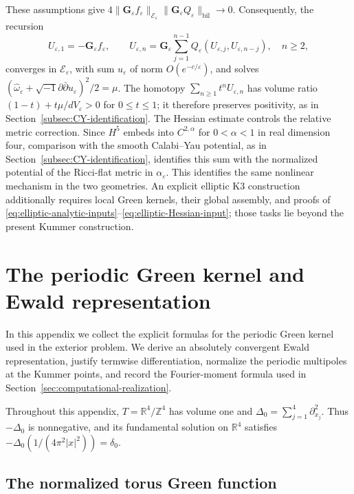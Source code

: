 \documentclass[11pt,a4paper,twoside]{article}
\numberwithin{equation}{section}
\newcommand{\ddc}{\sqrt{-1}\partial\bar\partial}
\theoremstyle{definition}
\theoremstyle{remark}
\newcommand{\ee}{\varepsilon}
\begin{document}
These assumptions give
\(4\|\mathbf G_\ee f_\ee\|_{\mathcal E_\ee}
\|\mathbf G_\ee Q_\ee\|_{\mathrm{bil}}\to0\).
Consequently, the recursion
\[
U_{\ee,1}=-\mathbf G_\ee f_\ee,\qquad
U_{\ee,n}=\mathbf G_\ee\sum_{j=1}^{n-1}
Q_\ee(U_{\ee,j},U_{\ee,n-j}),\quad n\ge2,
\]
converges in \(\mathcal E_\ee\), with sum \(u_\ee\) of norm
\(O(e^{-c/\ee})\), and solves
\((\widehat\omega_\ee+\ddc u_\ee)^2/2=\mu\).
The homotopy \(\sum_{n\ge1}t^nU_{\ee,n}\) has volume ratio
\((1-t)+t\mu/dV_\ee>0\) for \(0\le t\le1\); it therefore
preserves positivity, as in Section~\ref{subsec:CY-identification}.
The Hessian estimate controls the relative metric correction.
Since \(H^5\) embeds into \(C^{2,\alpha}\) for \(0<\alpha<1\)
in real dimension four, comparison with the smooth Calabi--Yau potential, as in
Section~\ref{subsec:CY-identification}, identifies this sum with
the normalized potential of the Ricci-flat metric in \(\alpha_\ee\).
This identifies the same nonlinear mechanism in the two geometries.
An explicit elliptic K3 construction additionally requires local
Green kernels, their global assembly, and proofs of
\eqref{eq:elliptic-analytic-inputs}--\eqref{eq:elliptic-Hessian-input};
those tasks lie beyond the present Kummer construction.

\clearpage
\appendix

\section{The periodic Green kernel and Ewald representation}
\label{app:ewald}

In this appendix we collect the explicit formulas for the periodic
Green kernel used in the exterior problem. We derive an absolutely
convergent Ewald representation, justify termwise differentiation,
normalize the periodic multipoles at the Kummer points, and record
the Fourier-moment formula used in
Section~\ref{sec:computational-realization}.

Throughout this appendix, \(T=\mathbb R^4/\mathbb Z^4\) has volume
one and \(\Delta_0=\sum_{j=1}^4\partial_{x_j}^2\). Thus
\(-\Delta_0\) is nonnegative, and its fundamental solution on
\(\mathbb R^4\) satisfies
\(-\Delta_0(1/(4\pi^2|x|^2))=\delta_0\).

\subsection{The normalized torus Green function}
\end{document}
